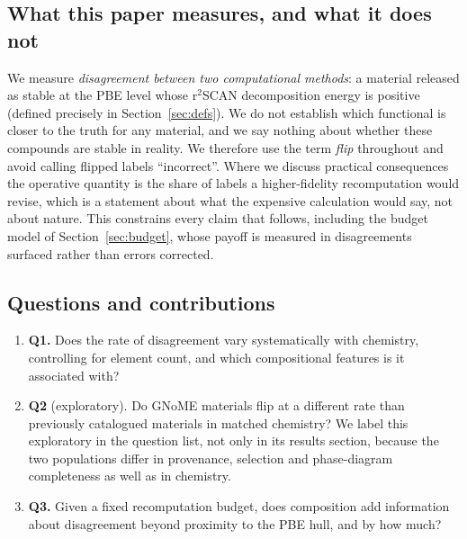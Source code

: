 \documentclass[11pt]{article}
\begin{document}
\subsection{What this paper measures, and what it does not}\label{sec:scope}

We measure \emph{disagreement between two computational methods}: a material released as
stable at the PBE level whose r$^2$SCAN decomposition energy is positive (defined precisely
in Section~\ref{sec:defs}). We do not establish
which functional is closer to the truth for any material, and we say nothing about
whether these compounds are stable in reality. We therefore use the term \emph{flip}
throughout and avoid calling flipped labels ``incorrect''. Where we discuss practical
consequences the operative quantity is the share of labels a higher-fidelity
recomputation would revise, which is a statement about what the expensive calculation
would say, not about nature. This constrains every claim that follows, including the
budget model of Section~\ref{sec:budget}, whose payoff is measured in disagreements
surfaced rather than errors corrected.

\subsection{Questions and contributions}\label{sec:contrib}

\begin{enumerate}
\item \textbf{Q1.} Does the rate of disagreement vary systematically with chemistry,
controlling for element count, and which compositional features is it associated with?
\item \textbf{Q2} (exploratory). Do GNoME materials flip at a different rate than
previously catalogued materials in matched chemistry? We label this exploratory in the
question list, not only in its results section, because the two populations differ in
provenance, selection and phase-diagram completeness as well as in chemistry.
\item \textbf{Q3.} Given a fixed recomputation budget, does composition add information
about disagreement beyond proximity to the PBE hull, and by how much?
\end{enumerate}
\end{document}
